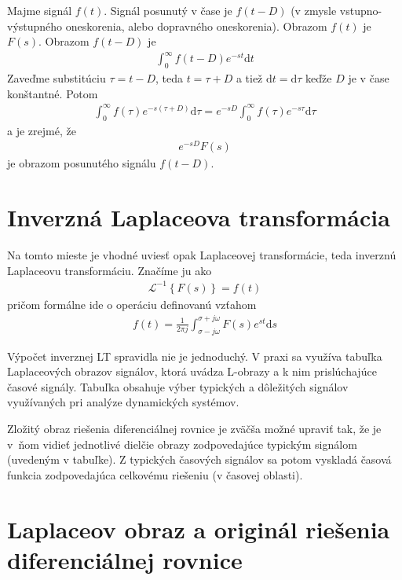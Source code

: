 \documentclass[a4paper, 10pt, ]{article}
\begin{document}
Majme signál $f(t)$. Signál posunutý v čase je $f(t-D)$ (v zmysle vstupno-výstupného oneskorenia, alebo dopravného oneskorenia). Obrazom $f(t)$ je $F(s)$. Obrazom $f(t-D)$ je
\begin{align}
    \int_0^\infty f(t-D) e^{-st} \text{d}t
\end{align}
Zaveďme substitúciu $\tau  = t-D$, teda $t=\tau+D$ a tiež $\text{d}t = \text{d}\tau$ keďže $D$ je v čase konštantné. Potom
\begin{align}
    \int_0^\infty f(\tau) e^{-s(\tau+D)} \text{d}\tau = e^{-sD} \int_0^\infty f(\tau) e^{-s\tau} \text{d}\tau
\end{align}
a je zrejmé, že
\begin{align}
    e^{-sD} F(s)
\end{align}
je obrazom posunutého signálu $f(t-D)$.





\section{Inverzná Laplaceova transformácia}

Na tomto mieste je vhodné uviesť opak Laplaceovej transformácie, teda inverznú Laplaceovu transformáciu. Značíme ju ako
\begin{align}
    \mathcal L ^{-1} \left\{ F(s) \right\} = f(t)
\end{align}
pričom formálne ide o operáciu definovanú vzťahom
\begin{align}
    f(t) = \frac{1}{2\pi j} \int_{\sigma-j\omega}^{\sigma + j\omega} F(s) e^{st} \text{d}s
\end{align}

Výpočet inverznej LT spravidla nie je jednoduchý. V praxi sa využíva tabuľka Laplaceových obrazov signálov, ktorá uvádza L-obrazy a k nim prislúchajúce časové signály. Tabuľka obsahuje výber typických a dôležitých signálov využívaných pri analýze dynamických systémov.

Zložitý obraz riešenia diferenciálnej rovnice je zväčša možné upraviť tak, že je v~ňom vidieť jednotlivé dielčie obrazy zodpovedajúce typickým signálom (uvedeným v tabuľke). Z typických časových signálov sa potom vyskladá časová funkcia zodpovedajúca celkovému riešeniu (v časovej oblasti).






\section{Laplaceov obraz a originál riešenia diferenciálnej rovnice}
\end{document}
